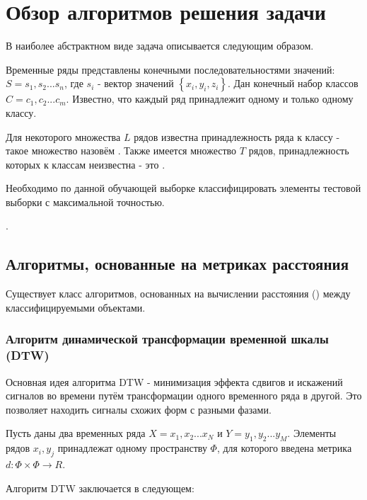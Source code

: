 
\chapter{Обзор алгоритмов решения задачи}

В наиболее абстрактном виде задача описывается следующим образом. 

Временные ряды представлены конечными последовательностями значений: $S=s_1,s_2...s_n$, где $s_i$ - вектор значений $\left\{x_i,y_i,z_i\right\}$. Дан конечный набор классов $C=c_1,c_2...c_m$. Известно, что каждый ряд принадлежит одному и только одному классу. 

Для некоторого множества $L$ рядов известна принадлежность ряда к классу - такое множество назовём . Также имеется множество $T$ рядов, принадлежность которых к классам неизвестна - это .

Необходимо по данной обучающей выборке классифицировать элементы тестовой выборки с максимальной точностью.

. 



\section{Алгоритмы, основанные на метриках расстояния}

Существует класс алгоритмов, основанных на вычислении расстояния () между классифицируемыми объектами. 

\subsection{Алгоритм динамической трансформации временной шкалы (DTW)}

Основная идея алгоритма DTW - минимизация эффекта сдвигов и искажений сигналов во времени путём трансформации одного временного ряда в другой. Это позволяет находить сигналы схожих форм с разными фазами\cite{dtw_review}. 

Пусть даны два временных ряда $X=x_1,x_2...x_N$ и $Y=y_1,y_2...y_M$. Элементы рядов $x_i,y_j$ принадлежат одному пространству  $\Phi$, для которого введена метрика $d: \Phi \times \Phi \to R$. 

Алгоритм DTW заключается в следующем:

